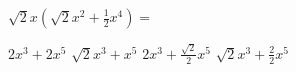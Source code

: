 
\question $\sqrt{2}x(\sqrt{2}x^2 + \frac{1}{2}x^4) = $

  \begin{oneparchoices}
    \choice $2x^3 + 2x^5$
    \choice $\sqrt{2}x^3 + x^5$
    \CorrectChoice $2x^3 + \frac{\sqrt{2}}{2}x^5$
    \choice $\sqrt{2}x^3 + \frac{2}{2}x^5$
  \end{oneparchoices}
